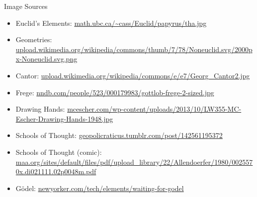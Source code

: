 \documentclass{beamer}
\begin{document}
\begin{frame}[allowframebreaks]{Image Sources}
\begin{itemize}
\item Euclid's Elements: \url{math.ubc.ca/~cass/Euclid/papyrus/tha.jpg}
\item Geometries: \url{upload.wikimedia.org/wikipedia/commons/thumb/7/78/Noneuclid.svg/2000px-Noneuclid.svg.png}
\item Cantor: \url{upload.wikimedia.org/wikipedia/commons/e/e7/Georg_Cantor2.jpg}
\item Frege: \url{nndb.com/people/523/000179983/gottlob-frege-2-sized.jpg}
\item Drawing Hands: \url{mcescher.com/wp-content/uploads/2013/10/LW355-MC-Escher-Drawing-Hands-1948.jpg}
\item Schools of Thought: \url{geopolicraticus.tumblr.com/post/142561195372}
\item Schools of Thought (comic): \url{maa.org/sites/default/files/pdf/upload\_library/22/Allendoerfer/1980/0025570x.di021111.02p0048m.pdf}
\item Gödel: \url{newyorker.com/tech/elements/waiting-for-godel}
\end{itemize}
\end{frame}
\end{document}
